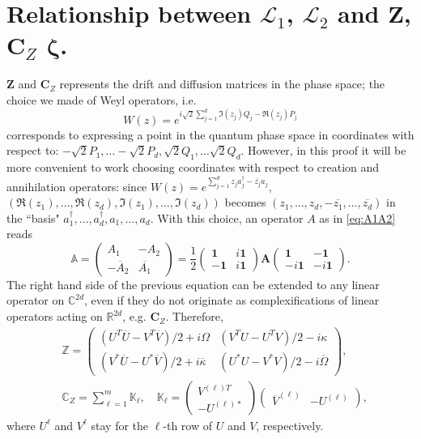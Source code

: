 \documentclass[preprint]{elsarticle}
\theoremstyle{definition}
\def\CC{\mathbb{C}}
\def\RR{\mathbb{R}}
\def\LL{\mathcal{L}}
\begin{document}
\section{Relationship between $\LL_1$, $\LL_2$ and $\mathbf{Z}$, $\mathbf{C}_{Z}$ $\boldsymbol{\zeta}$.} \label{app:l1l2}
$\mathbf{Z}$ and $\mathbf{C}_{Z}$ represents the drift and diffusion matrices in the phase space; the choice we made of Weyl operators, i.e.
$$W(z)=e^{i\sqrt{2}\sum_{j=1}^{d}\Im(z_j)Q_j-\Re(z_j)P_j}$$
corresponds to expressing a point in the quantum phase space in coordinates with respect to:
$-\sqrt{2}P_1,
\dots
-\sqrt{2}P_d,
\sqrt{2}Q_1,
\dots
\sqrt{2}Q_d$.
However, in this proof it will be more convenient to work choosing coordinates with respect to creation and annihilation operators: since $W(z)=e^{\sum_{j=1}^{d}z_ja_j^\dagger-\overline{z_j}a_j}$, $(\Re(z_1), \dots, \Re(z_d), \Im(z_1), \dots, \Im(z_d))$ becomes $(z_1,\dots, z_d, -\overline{z_1}, \dots, \overline{z_d})$ in the ``basis" $a_1^\dagger, \dots, a_d^\dagger, a_1, \dots, a_d.$ With this choice, an operator $A$ as in \eqref{eq:A1A2} reads
$$\mathbb{A}=\begin{pmatrix} A_1 & -A_2\\
-\overline{A}_2 & \overline{A_1} \end{pmatrix}=\frac{1}{2}\begin{pmatrix} \mathbf{1} & i \mathbf{1} \\
-\mathbf{1} & i \mathbf{1}\end{pmatrix}\mathbf{A} \begin{pmatrix} \mathbf{1} & - \mathbf{1} \\
-i\mathbf{1} & -i \mathbf{1}\end{pmatrix}.$$
The right hand side of the previous equation can be extended to any linear operator on $\CC^{2d}$, even if they do not originate as complexifications of linear operators acting on $\RR^{2d}$, e.g. $\mathbf{C}_{Z}$. 
Therefore,
\begin{align}
&\mathbb{Z}=\begin{pmatrix} (U^T\overline{U}-V^T\overline{V})/2+i\Omega & (V^TU-U^T V)/2 -i \kappa\\
(V^*\overline{U}-U^*\overline{V})/2+i\overline{\kappa} & (U^*U-V^*V)/2-i\overline{\Omega}\end{pmatrix}, \label{eq:bbZ}\\
&\mathbb{C}_{Z}=\sum_{\ell=1}^{m}\mathbb{K}_{\ell}, \quad \mathbb{K}_{\ell}=\begin{pmatrix}V^{(\ell)T}\\ -U^{(\ell)*}\end{pmatrix}\begin{pmatrix}\overline{V}^{(\ell)} &-U^{(\ell)}\end{pmatrix},\label{eq:bbCZ}\end{align}
where $U^{\ell}$ and $V^{\ell}$ stay for the $\ell$-th row of $U$ and $V$, respectively.
\end{document}
